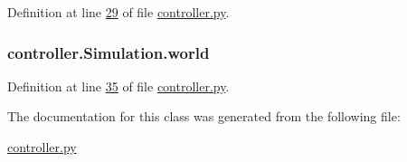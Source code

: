 Definition at line \hyperlink{controller_8py_source_l00029}{29} of file \hyperlink{controller_8py_source}{controller.\+py}.

\hypertarget{classcontroller_1_1Simulation_a2ba0c3cf1949a98dd920f6097953c1f5}{
\subsubsection[{world}]{\setlength{\rightskip}{0pt plus 5cm}controller.\+Simulation.\+world}}\label{classcontroller_1_1Simulation_a2ba0c3cf1949a98dd920f6097953c1f5}


Definition at line \hyperlink{controller_8py_source_l00035}{35} of file \hyperlink{controller_8py_source}{controller.\+py}.



The documentation for this class was generated from the following file\+:\begin{DoxyCompactItemize}
\item 
\hyperlink{controller_8py}{controller.\+py}\end{DoxyCompactItemize}
